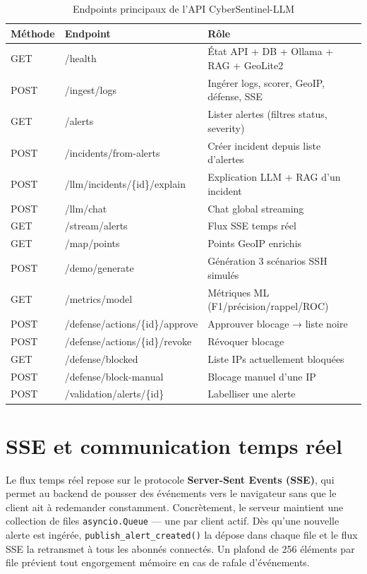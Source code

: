 \documentclass[12pt,a4paper]{report}
\begin{document}
\begin{table}[H]
\centering
\caption{Endpoints principaux de l'API CyberSentinel-LLM}
\label{tab:endpoints}
\begin{tabular}{|p{1.5cm}|p{5.5cm}|p{6.5cm}|}
\hline
\textbf{Méthode} & \textbf{Endpoint} & \textbf{Rôle} \\
\hline
GET & /health & État API + DB + Ollama + RAG + GeoLite2 \\
\hline
POST & /ingest/logs & Ingérer logs, scorer, GeoIP, défense, SSE \\
\hline
GET & /alerts & Lister alertes (filtres status, severity) \\
\hline
POST & /incidents/from-alerts & Créer incident depuis liste d'alertes \\
\hline
POST & /llm/incidents/\{id\}/explain & Explication LLM + RAG d'un incident \\
\hline
POST & /llm/chat & Chat global streaming \\
\hline
GET & /stream/alerts & Flux SSE temps réel \\
\hline
GET & /map/points & Points GeoIP enrichis \\
\hline
POST & /demo/generate & Génération 3 scénarios SSH simulés \\
\hline
GET & /metrics/model & Métriques ML (F1/précision/rappel/ROC) \\
\hline
POST & /defense/actions/\{id\}/approve & Approuver blocage → liste noire \\
\hline
POST & /defense/actions/\{id\}/revoke & Révoquer blocage \\
\hline
GET & /defense/blocked & Liste IPs actuellement bloquées \\
\hline
POST & /defense/block-manual & Blocage manuel d'une IP \\
\hline
POST & /validation/alerts/\{id\} & Labelliser une alerte \\
\hline
\end{tabular}
\end{table}

\section{SSE et communication temps réel}
\begin{onehalfspace}
Le flux temps réel repose sur le protocole \textbf{Server-Sent Events (SSE)},
qui permet au backend de pousser des événements vers le navigateur sans que
le client ait à redemander constamment. Concrètement, le serveur maintient
une collection de files \texttt{asyncio.Queue} — une par client actif.
Dès qu'une nouvelle alerte est ingérée, \texttt{publish\_alert\_created()}
la dépose dans chaque file et le flux SSE la retransmet à tous les abonnés
connectés. Un plafond de 256 éléments par file prévient tout engorgement
mémoire en cas de rafale d'événements.
\end{onehalfspace}
\end{document}
